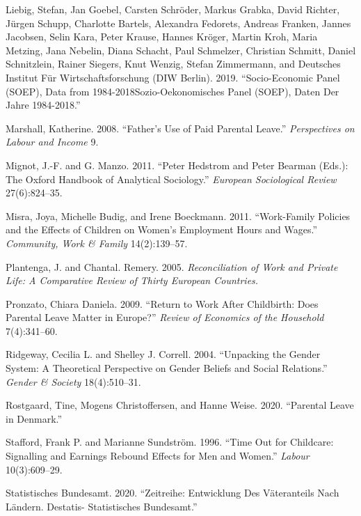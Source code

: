 \documentclass[
  11pt,
]{article}
\begin{document}
\leavevmode\hypertarget{ref-liebig_socio-economic_2019}{}%
Liebig, Stefan, Jan Goebel, Carsten Schröder, Markus Grabka, David Richter, Jürgen Schupp, Charlotte Bartels, Alexandra Fedorets, Andreas Franken, Jannes Jacobsen, Selin Kara, Peter Krause, Hannes Kröger, Martin Kroh, Maria Metzing, Jana Nebelin, Diana Schacht, Paul Schmelzer, Christian Schmitt, Daniel Schnitzlein, Rainer Siegers, Knut Wenzig, Stefan Zimmermann, and Deutsches Institut Für Wirtschaftsforschung (DIW Berlin). 2019. ``Socio-Economic Panel (SOEP), Data from 1984-2018Sozio-Oekonomisches Panel (SOEP), Daten Der Jahre 1984-2018.''

\leavevmode\hypertarget{ref-marshall_fathers_2008}{}%
Marshall, Katherine. 2008. ``Father's Use of Paid Parental Leave.'' \emph{Perspectives on Labour and Income} 9.

\leavevmode\hypertarget{ref-mignot_peter_2011}{}%
Mignot, J.-F. and G. Manzo. 2011. ``Peter Hedstrom and Peter Bearman (Eds.): The Oxford Handbook of Analytical Sociology.'' \emph{European Sociological Review} 27(6):824--35.

\leavevmode\hypertarget{ref-misra_work-family_2011}{}%
Misra, Joya, Michelle Budig, and Irene Boeckmann. 2011. ``Work-Family Policies and the Effects of Children on Women's Employment Hours and Wages.'' \emph{Community, Work \& Family} 14(2):139--57.

\leavevmode\hypertarget{ref-plantenga_reconciliation_2005}{}%
Plantenga, J. and Chantal. Remery. 2005. \emph{Reconciliation of Work and Private Life: A Comparative Review of Thirty European Countries.}

\leavevmode\hypertarget{ref-pronzato_return_2009}{}%
Pronzato, Chiara Daniela. 2009. ``Return to Work After Childbirth: Does Parental Leave Matter in Europe?'' \emph{Review of Economics of the Household} 7(4):341--60.

\leavevmode\hypertarget{ref-ridgeway_unpacking_2004}{}%
Ridgeway, Cecilia L. and Shelley J. Correll. 2004. ``Unpacking the Gender System: A Theoretical Perspective on Gender Beliefs and Social Relations.'' \emph{Gender \& Society} 18(4):510--31.

\leavevmode\hypertarget{ref-rostgaard_parental_2020}{}%
Rostgaard, Tine, Mogens Christoffersen, and Hanne Weise. 2020. ``Parental Leave in Denmark.''

\leavevmode\hypertarget{ref-stafford_time_1996}{}%
Stafford, Frank P. and Marianne Sundström. 1996. ``Time Out for Childcare: Signalling and Earnings Rebound Effects for Men and Women.'' \emph{Labour} 10(3):609--29.

\leavevmode\hypertarget{ref-statistisches_bundesamt_zeitreihe_2020}{}%
Statistisches Bundesamt. 2020. ``Zeitreihe: Entwicklung Des Väteranteils Nach Ländern. Destatis- Statistisches Bundesamt.''
\end{document}
